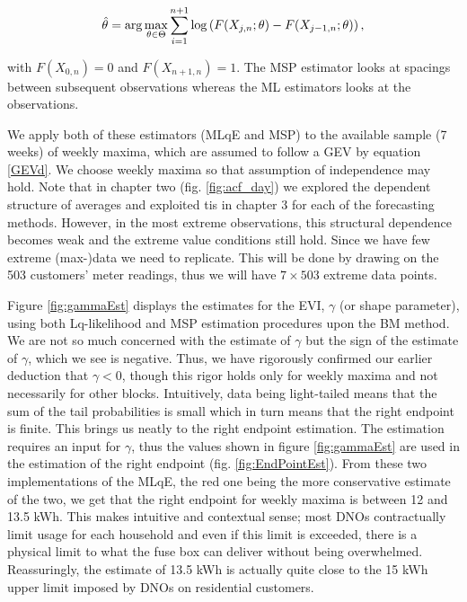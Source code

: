 \begin{equation*}
\hat{\theta} = \displaystyle {\arg\max_{\theta \in \Theta}} \sum\limits_{i=1}^{n+1} \log \left( F(X_{j,n};\theta) - F(X_{j-1,n};\theta) \right),
\end{equation*}

\noindent with $F(X_{0,n}) = 0$ and $F(X_{n+1,n}) = 1$. %
The MSP estimator looks at spacings between subsequent observations whereas the ML estimators looks at the observations.

We apply both of these estimators (MLqE and MSP) to the available sample (7 weeks) of weekly maxima, which are assumed to follow a GEV by equation \ref{GEVd}. We choose weekly maxima so that assumption of independence may hold. Note that in chapter two (fig. \ref{fig:acf_day}) we explored the dependent structure of averages and exploited tis in chapter 3 for each of the forecasting methods. However, in the most extreme observations, this structural dependence becomes weak and the extreme value conditions still hold. Since we have few extreme (max-)data we need to replicate. This will be done by drawing on the 503 customers' meter readings, thus we will have $7 \times 503$ extreme data points.

Figure \ref{fig:gammaEst} displays the estimates for the EVI, $\gamma$ (or shape parameter), using both Lq-likelihood and MSP estimation procedures upon the BM method. We are not so much concerned with the estimate of $\gamma$ but the sign of the estimate of $\gamma$, which we see is negative. Thus, we have rigorously confirmed our earlier deduction that $\gamma <0$, though this rigor holds only for weekly maxima and not necessarily for other blocks. Intuitively, data being light-tailed means that the sum of the tail probabilities is small which in turn means that the right endpoint is finite. This brings us neatly to the right endpoint estimation. The estimation requires an input for $\gamma$, thus the values shown in figure \ref{fig:gammaEst} are used in the estimation of the right endpoint (fig. \ref{fig:EndPointEst}). From these two implementations of the MLqE, the red one being the more conservative estimate of the two, we get that the right endpoint for weekly maxima is between 12 and 13.5 kWh. This makes intuitive and contextual sense; most DNOs contractually limit usage for each household and even if this limit is exceeded, there is a physical limit to what the fuse box can deliver without being overwhelmed.  Reassuringly, the estimate of 13.5 kWh is actually quite close to the 15 kWh upper limit imposed by DNOs on residential customers.

